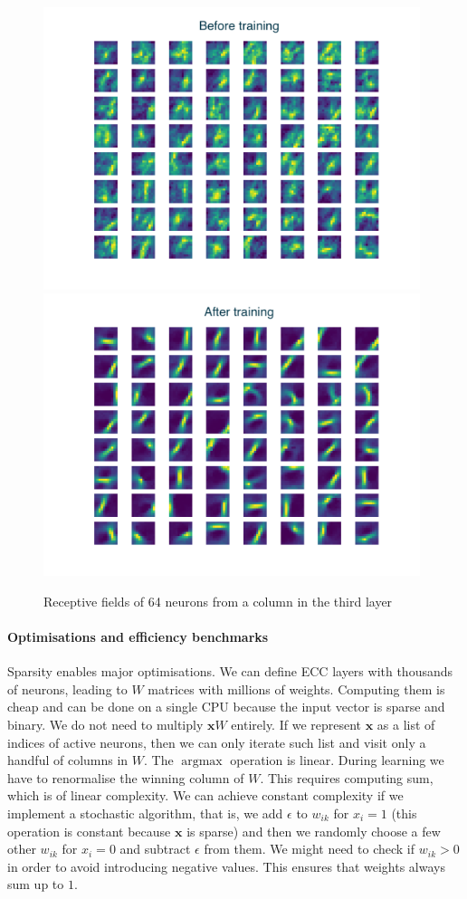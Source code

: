 \documentclass[12pt]{article}
\DeclareMathOperator*{\argmax}{argmax}
\begin{document}
\begin{figure}[!htbp]
	\centering
	\includegraphics[width=11cm]{k5s2c1d1_k2s1c20d1_k3s1c49d1_c64 machine before}
	\includegraphics[width=11cm]{k5s2c1d1_k2s1c20d1_k3s1c49d1_c64 machine after}
	\caption{Receptive fields of 64 neurons from a column in the third layer}
	\label{fig:layer3}
\end{figure} 


\paragraph{Optimisations and efficiency benchmarks}
Sparsity enables major optimisations. We can define ECC layers with thousands of neurons, leading to $W$ matrices with millions of weights. Computing them is cheap and can be done on a single CPU because the input vector is sparse and binary. We do not need to multiply $\boldsymbol{x}W$ entirely. If we represent $\boldsymbol{x}$ as a list of indices of active neurons, then we can only iterate such list and visit only a handful of columns in $W$. The $\argmax$ operation is linear. During learning we have to renormalise the winning column of $W$. This requires computing sum, which is of linear complexity. We can achieve constant complexity if we implement a stochastic algorithm, that is, we add $\epsilon$ to $w_{ik}$ for $x_i=1$ (this operation is constant because $\boldsymbol{x}$ is sparse) and then we randomly choose a few other $w_{ik}$ for $x_i=0$ and subtract $\epsilon$ from them. We might need to check if $w_{ik}>0$ in order to avoid introducing negative values. This ensures that weights always sum up to $1$.
\end{document}
